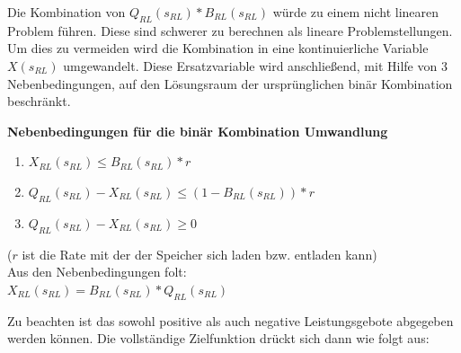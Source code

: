 \documentclass{article}
\begin{document}
Die Kombination von $Q_{RL}(s_{RL}) * B_{RL}(s_{RL})$ würde zu einem nicht linearen Problem führen. Diese sind schwerer zu berechnen als lineare Problemstellungen. Um dies zu vermeiden wird die Kombination in eine kontinuierliche Variable $X(s_{RL})$ umgewandelt. Diese Ersatzvariable wird anschließend, mit Hilfe von 3 Nebenbedingungen, auf den Lösungsraum der ursprünglichen binär Kombination beschränkt.

\textbf{Nebenbedingungen für die binär Kombination Umwandlung}
\begin{enumerate}
    \item $X_{RL}(s_{RL}) \leq B_{RL}(s_{RL}) * r$
    \item $Q_{RL}(s_{RL}) - X_{RL}(s_{RL}) \leq (1 - B_{RL}(s_{RL})) * r $
    \item $Q_{RL}(s_{RL}) - X_{RL}(s_{RL}) \geq 0 $
\end{enumerate}
($r$ ist die Rate mit der der Speicher sich laden bzw. entladen kann)\\
Aus den Nebenbedingungen folt:\\

$X_{RL}(s_{RL}) = B_{RL}(s_{RL}) * Q_{RL}(s_{RL}) $


Zu beachten ist das sowohl positive als auch negative Leistungsgebote abgegeben werden können. Die vollständige Zielfunktion drückt sich dann wie folgt aus:\\
\end{document}

